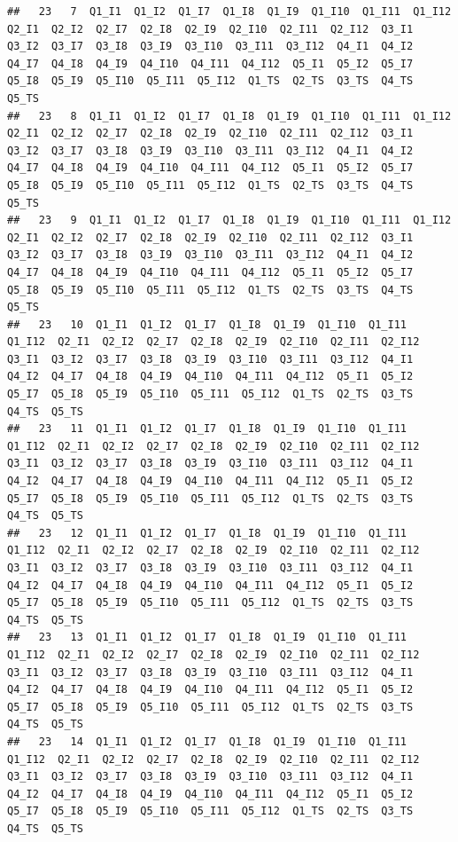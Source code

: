 \documentclass[
]{book}
\begin{document}
\begin{verbatim}
##   23   7  Q1_I1  Q1_I2  Q1_I7  Q1_I8  Q1_I9  Q1_I10  Q1_I11  Q1_I12  Q2_I1  Q2_I2  Q2_I7  Q2_I8  Q2_I9  Q2_I10  Q2_I11  Q2_I12  Q3_I1  Q3_I2  Q3_I7  Q3_I8  Q3_I9  Q3_I10  Q3_I11  Q3_I12  Q4_I1  Q4_I2  Q4_I7  Q4_I8  Q4_I9  Q4_I10  Q4_I11  Q4_I12  Q5_I1  Q5_I2  Q5_I7  Q5_I8  Q5_I9  Q5_I10  Q5_I11  Q5_I12  Q1_TS  Q2_TS  Q3_TS  Q4_TS  Q5_TS
##   23   8  Q1_I1  Q1_I2  Q1_I7  Q1_I8  Q1_I9  Q1_I10  Q1_I11  Q1_I12  Q2_I1  Q2_I2  Q2_I7  Q2_I8  Q2_I9  Q2_I10  Q2_I11  Q2_I12  Q3_I1  Q3_I2  Q3_I7  Q3_I8  Q3_I9  Q3_I10  Q3_I11  Q3_I12  Q4_I1  Q4_I2  Q4_I7  Q4_I8  Q4_I9  Q4_I10  Q4_I11  Q4_I12  Q5_I1  Q5_I2  Q5_I7  Q5_I8  Q5_I9  Q5_I10  Q5_I11  Q5_I12  Q1_TS  Q2_TS  Q3_TS  Q4_TS  Q5_TS
##   23   9  Q1_I1  Q1_I2  Q1_I7  Q1_I8  Q1_I9  Q1_I10  Q1_I11  Q1_I12  Q2_I1  Q2_I2  Q2_I7  Q2_I8  Q2_I9  Q2_I10  Q2_I11  Q2_I12  Q3_I1  Q3_I2  Q3_I7  Q3_I8  Q3_I9  Q3_I10  Q3_I11  Q3_I12  Q4_I1  Q4_I2  Q4_I7  Q4_I8  Q4_I9  Q4_I10  Q4_I11  Q4_I12  Q5_I1  Q5_I2  Q5_I7  Q5_I8  Q5_I9  Q5_I10  Q5_I11  Q5_I12  Q1_TS  Q2_TS  Q3_TS  Q4_TS  Q5_TS
##   23   10  Q1_I1  Q1_I2  Q1_I7  Q1_I8  Q1_I9  Q1_I10  Q1_I11  Q1_I12  Q2_I1  Q2_I2  Q2_I7  Q2_I8  Q2_I9  Q2_I10  Q2_I11  Q2_I12  Q3_I1  Q3_I2  Q3_I7  Q3_I8  Q3_I9  Q3_I10  Q3_I11  Q3_I12  Q4_I1  Q4_I2  Q4_I7  Q4_I8  Q4_I9  Q4_I10  Q4_I11  Q4_I12  Q5_I1  Q5_I2  Q5_I7  Q5_I8  Q5_I9  Q5_I10  Q5_I11  Q5_I12  Q1_TS  Q2_TS  Q3_TS  Q4_TS  Q5_TS
##   23   11  Q1_I1  Q1_I2  Q1_I7  Q1_I8  Q1_I9  Q1_I10  Q1_I11  Q1_I12  Q2_I1  Q2_I2  Q2_I7  Q2_I8  Q2_I9  Q2_I10  Q2_I11  Q2_I12  Q3_I1  Q3_I2  Q3_I7  Q3_I8  Q3_I9  Q3_I10  Q3_I11  Q3_I12  Q4_I1  Q4_I2  Q4_I7  Q4_I8  Q4_I9  Q4_I10  Q4_I11  Q4_I12  Q5_I1  Q5_I2  Q5_I7  Q5_I8  Q5_I9  Q5_I10  Q5_I11  Q5_I12  Q1_TS  Q2_TS  Q3_TS  Q4_TS  Q5_TS
##   23   12  Q1_I1  Q1_I2  Q1_I7  Q1_I8  Q1_I9  Q1_I10  Q1_I11  Q1_I12  Q2_I1  Q2_I2  Q2_I7  Q2_I8  Q2_I9  Q2_I10  Q2_I11  Q2_I12  Q3_I1  Q3_I2  Q3_I7  Q3_I8  Q3_I9  Q3_I10  Q3_I11  Q3_I12  Q4_I1  Q4_I2  Q4_I7  Q4_I8  Q4_I9  Q4_I10  Q4_I11  Q4_I12  Q5_I1  Q5_I2  Q5_I7  Q5_I8  Q5_I9  Q5_I10  Q5_I11  Q5_I12  Q1_TS  Q2_TS  Q3_TS  Q4_TS  Q5_TS
##   23   13  Q1_I1  Q1_I2  Q1_I7  Q1_I8  Q1_I9  Q1_I10  Q1_I11  Q1_I12  Q2_I1  Q2_I2  Q2_I7  Q2_I8  Q2_I9  Q2_I10  Q2_I11  Q2_I12  Q3_I1  Q3_I2  Q3_I7  Q3_I8  Q3_I9  Q3_I10  Q3_I11  Q3_I12  Q4_I1  Q4_I2  Q4_I7  Q4_I8  Q4_I9  Q4_I10  Q4_I11  Q4_I12  Q5_I1  Q5_I2  Q5_I7  Q5_I8  Q5_I9  Q5_I10  Q5_I11  Q5_I12  Q1_TS  Q2_TS  Q3_TS  Q4_TS  Q5_TS
##   23   14  Q1_I1  Q1_I2  Q1_I7  Q1_I8  Q1_I9  Q1_I10  Q1_I11  Q1_I12  Q2_I1  Q2_I2  Q2_I7  Q2_I8  Q2_I9  Q2_I10  Q2_I11  Q2_I12  Q3_I1  Q3_I2  Q3_I7  Q3_I8  Q3_I9  Q3_I10  Q3_I11  Q3_I12  Q4_I1  Q4_I2  Q4_I7  Q4_I8  Q4_I9  Q4_I10  Q4_I11  Q4_I12  Q5_I1  Q5_I2  Q5_I7  Q5_I8  Q5_I9  Q5_I10  Q5_I11  Q5_I12  Q1_TS  Q2_TS  Q3_TS  Q4_TS  Q5_TS

\end{verbatim}
\end{document}
